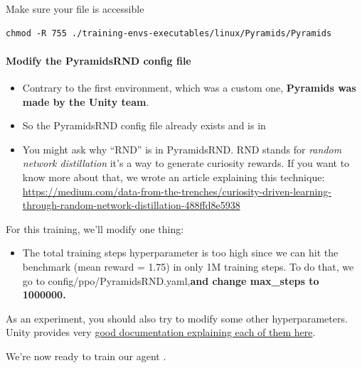 \documentclass[11pt,a4paper]{article}
\begin{document}
Make sure your file is accessible

\begin{lstlisting}
chmod -R 755 ./training-envs-executables/linux/Pyramids/Pyramids
\end{lstlisting}

\paragraph{Modify the PyramidsRND config file}\label{modify-the-pyramidsrnd-config-file}

\begin{itemize}
\tightlist
\item
  Contrary to the first environment, which was a custom one, \textbf{Pyramids was made by the Unity team}.
\item
  So the PyramidsRND config file already exists and is in 
\item
  You might ask why ``RND'' is in PyramidsRND. RND stands for \emph{random network distillation} it's a way to generate curiosity rewards. If you want to know more about that, we wrote an article explaining this technique: \url{https://medium.com/data-from-the-trenches/curiosity-driven-learning-through-random-network-distillation-488ffd8e5938}
\end{itemize}

For this training, we'll modify one thing:

\begin{itemize}
\tightlist
\item
  The total training steps hyperparameter is too high since we can hit the benchmark (mean reward = 1.75) in only 1M training steps. To do that, we go to config/ppo/PyramidsRND.yaml,\textbf{and change max\_steps to 1000000.}
\end{itemize}


As an experiment, you should also try to modify some other hyperparameters. Unity provides very \href{https://github.com/Unity-Technologies/ml-agents/blob/main/docs/Training-Configuration-File.md}{good documentation explaining each of them here}.

We're now ready to train our agent .
\end{document}
